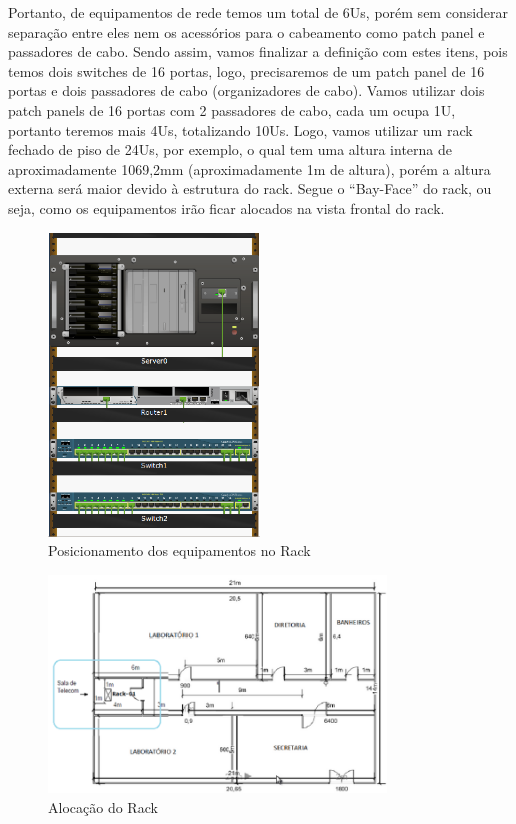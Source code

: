 \documentclass[	DIV=calc,%
							paper=a4,%
							fontsize=12pt,%
							onecolumn]{scrartcl}	 					%
\begin{document}
Portanto, de equipamentos de rede temos um total de 6Us, porém sem considerar separação entre eles nem os acessórios para o cabeamento como patch panel e passadores de cabo. Sendo assim, vamos finalizar a definição com estes itens, pois temos dois switches de 16 portas, logo, precisaremos de um patch panel de 16 portas e dois passadores de cabo (organizadores de cabo). Vamos utilizar dois patch panels de 16 portas com 2 passadores de cabo, cada um ocupa 1U, portanto teremos mais 4Us, totalizando 10Us. 
Logo, vamos utilizar um rack fechado de piso de 24Us, por exemplo, o qual tem uma altura interna de aproximadamente 1069,2mm (aproximadamente 1m de altura), porém a altura externa será maior devido à estrutura do rack. 
Segue o “Bay-Face” do rack, ou seja, como os equipamentos irão ficar alocados na vista frontal do rack.
\begin{figure}[H]
	\centering
	\includegraphics[width=0.5\textwidth]{fig5}
	\caption{Posicionamento dos equipamentos no Rack}
	\label{fig5}
\end{figure}

\begin{figure}[H]
	\centering
	\includegraphics[width=0.8\textwidth]{fig6}
	\caption{Alocação do Rack}
	\label{fig6}
\end{figure}
\end{document}
